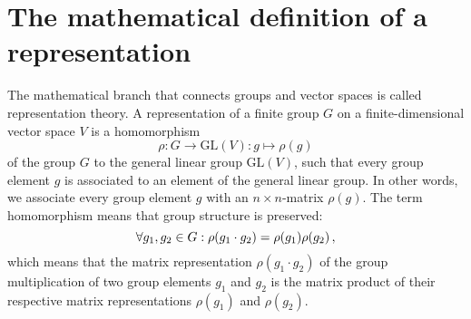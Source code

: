 \section{The mathematical definition of a representation}
     The mathematical branch that connects groups and vector spaces is called representation theory. A representation of a finite group $G$ on a finite-dimensional vector space $V$ is a homomorphism
     \begin{equation}
        \rho: G \rightarrow \text{GL}(V): g \mapsto \rho(g)
     \end{equation}
     of the group $G$ to the general linear group $\text{GL}(V)$, such that every group element $g$ is associated to an element of the general linear group. In other words, we associate every group element $g$ with an $n \times n$-matrix $\rho(g)$. The term homomorphism means that group structure is preserved:
     \begin{equation}
       \forall g_1, g_2 \in G: \rho(g_1 \cdot g_2) = \rho(g_1) \rho(g_2) \thinspace ,
     \end{equation}
     which means that the matrix representation $\rho(g_1 \cdot g_2)$ of the group multiplication of two group elements $g_1$ and $g_2$ is the matrix product of their respective matrix representations $\rho(g_1)$ and $\rho(g_2)$.
